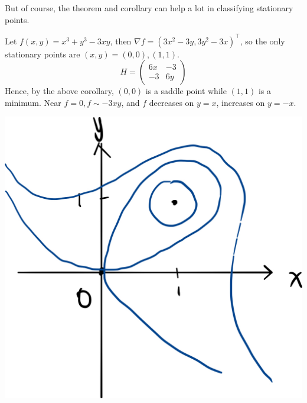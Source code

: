 \documentclass{article}
\begin{document}
But of course, the theorem and corollary can help a lot in classifying stationary points.
\begin{example}
    Let $f(x,y)=x^3+y^3-3xy$, then $\nabla f=(3x^2-3y,3y^2-3x)^\top$, so the only stationary points are $(x,y)=(0,0),(1,1)$.
    $$H=\begin{pmatrix}
        6x&-3\\
        -3&6y
    \end{pmatrix}$$
    Hence, by the above corollary, $(0,0)$ is a saddle point while $(1,1)$ is a minimum. Near $ f=0, f \sim -3xy $, and $f$ decreases on $y=x$, increases on $y=-x$.
    \begin{center}\vspace{1ex}
        \includegraphics[scale=0.1]{phase_1.1.jpeg}
    \end{center}
\end{example}
\end{document}
